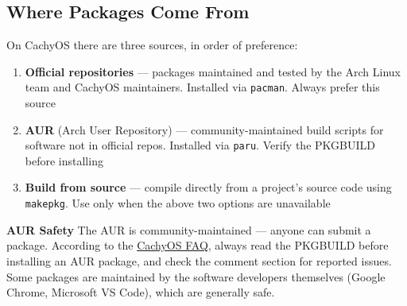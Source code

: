 \documentclass{article}
\newcommand{\code}[1]{\colorbox{codebg}{\texttt{#1}}}
\begin{document}
\subsection{Where Packages Come From}

On CachyOS there are three sources, in order of preference:

\begin{enumerate}[leftmargin=1.5em, label={\arabic*.}, nosep]
	\item \textbf{Official repositories} --- packages maintained and tested by the
	Arch Linux team and CachyOS maintainers. Installed via \code{pacman}. Always
	prefer this source
	\item \textbf{AUR} (Arch User Repository) --- community-maintained build scripts
	for software not in official repos. Installed via \code{paru}. Verify the
	PKGBUILD before installing
	\item \textbf{Build from source} --- compile directly from a project's source code
	using \code{makepkg}. Use only when the above two options are unavailable
\end{enumerate}

\begin{callout}{\textbf{AUR Safety}}
	The AUR is community-maintained --- anyone can submit a package. According to the
	\href{https://wiki.cachyos.org/cachyos_basic/faq/}{CachyOS FAQ}, always read the
	PKGBUILD before installing an AUR package, and check the comment section for
	reported issues. Some packages are maintained by the software developers themselves
	(Google Chrome, Microsoft VS Code), which are generally safe.
\end{callout}
\end{document}
